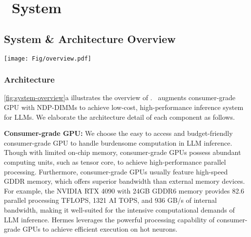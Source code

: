 \section{\name~System}
\subsection{System \& Architecture Overview}

\begin{figure*}
    \centering
    \texttt{[image: Fig/overview.pdf]}
    \vspace{-0.3cm}
    \caption{Overview of our proposed Hermes System. (a) Hermes augments GPU memory with NDP-DIMMs, and utilizes scheduler to control the inference workflow. (b) Multiple NDP-DIMMs are connected to support LLM inference and inter-DIMM communication. }
    \label{fig:system-overview}
\vspace{-0.3cm}
\end{figure*}

\subsubsection{Architecture}

\fig\ref{fig:system-overview}a illustrates the overview of \name. \name~augments consumer-grade GPU with NDP-DIMMs to achieve low-cost, high-performance inference system for LLMs. We elaborate the architecture detail of each component as follows.

\textbf{Consumer-grade GPU:}
We choose the easy to access and budget-friendly consumer-grade GPU to handle burdensome computation in LLM inference. Though with limited on-chip memory, consumer-grade GPUs possess abundant computing units, such as tensor core, to achieve high-performance parallel processing. Furthermore, consumer-grade GPUs usually feature high-speed GDDR memory, which offers superior bandwidth than external memory devices. For example, the NVIDIA RTX 4090 with 24GB GDDR6 memory provides 82.6 parallel processing TFLOPS, 1321 AI TOPS, and 936 GB/s of internal bandwidth, making it well-suited for the intensive computational demands of LLM inference. Hermes leverages the powerful processing capability of consumer-grade GPUs to achieve efficient execution on hot neurons. 


